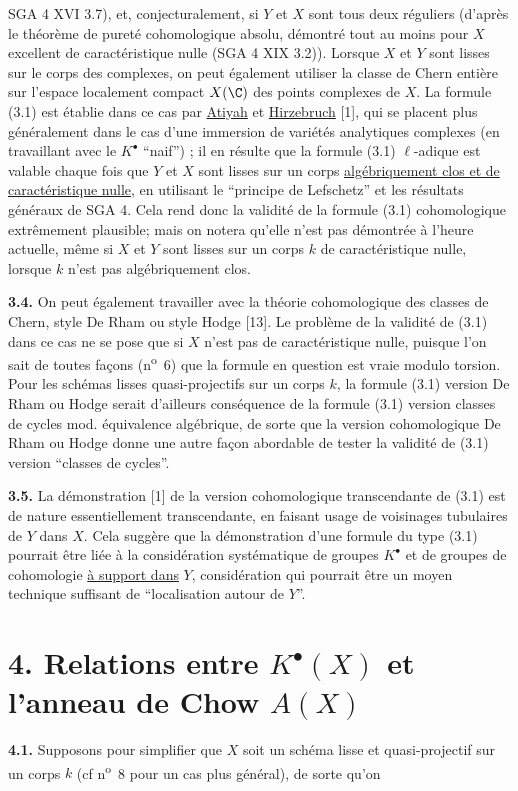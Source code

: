 
SGA 4 XVI 3.7), et,
conjecturalement, si $Y$ et $X$ sont tous deux réguliers (d'après le théorème de pureté cohomologique absolu, démontré tout au moins pour $X$ excellent de caractéristique nulle (SGA 4 XIX 3.2)). Lorsque $X$ et $Y$ sont lisses sur le corps des complexes, on peut également utiliser la classe de Chern entière sur l'espace localement compact $X(\C)$ des points complexes de $X$. La formule (3.1) est établie dans ce cas par \uline{Atiyah} et \uline{Hirzebruch} [1], qui se placent plus généralement dans le cas d'une immersion de variétés analytiques complexes (en travaillant avec le $K^\bullet$ ``naif'') ; il en résulte que la formule (3.1) $\ell$-adique est valable chaque fois que $Y$ et $X$ sont lisses sur un corps \uline{algébriquement clos et de caractéristique nulle}, en utilisant le ``principe de Lefschetz'' et les résultats généraux de SGA 4. Cela rend donc la validité de la formule (3.1) cohomologique extrêmement plausible; mais on notera qu'elle n'est pas démontrée à l'heure actuelle, même si $X$ et $Y$ sont lisses sur un corps $k$ de caractéristique nulle, lorsque $k$ n'est pas algébriquement clos.

\textbf{3.4.} On peut également travailler avec la théorie cohomologique des classes de Chern, style De Rham ou style Hodge [13]. Le problème de la validité de (3.1) dans ce cas ne se pose que si $X$ n'est pas de caractéristique nulle, puisque l'on sait de toutes façons (n\textsuperscript{o}~6) que la formule en question est vraie modulo torsion. Pour les schémas lisses quasi-projectifs sur un corps $k$, la formule (3.1) version De Rham ou Hodge serait d'ailleurs conséquence de la formule (3.1) version classes de cycles mod. équivalence algébrique, de sorte que la version cohomologique De Rham ou Hodge donne une autre façon abordable de tester la validité de (3.1) version ``classes de cycles''.

\textbf{3.5.} La démonstration [1] de la version cohomologique transcendante de (3.1) est de nature essentiellement transcendante, en faisant usage de voisinages tubulaires de $Y$ dans $X$. Cela suggère que la démonstration d'une formule du type (3.1) pourrait être liée à la considération systématique de groupes $K^\bullet$ et de groupes de cohomologie \uline{à support dans} $Y$, considération qui pourrait être un moyen technique suffisant de ``localisation autour de $Y$''.

\section*{4. Relations entre $K^\bullet(X)$ et l'anneau de Chow $A(X)$}

\textbf{4.1.} Supposons pour simplifier que $X$ soit un schéma lisse et quasi-projectif sur un corps $k$ (cf n\textsuperscript{o}~8 pour un cas plus général), de sorte qu'on
